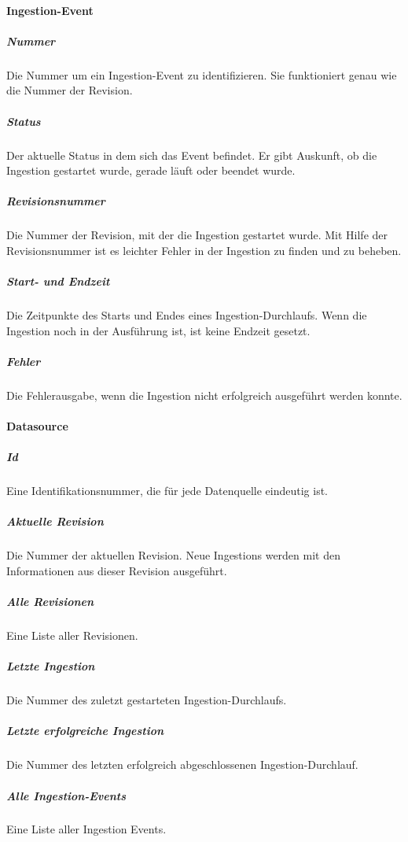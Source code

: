 \paragraph{Ingestion-Event}
\subparagraph{Nummer}
Die Nummer um ein Ingestion-Event zu identifizieren.
Sie funktioniert genau wie die Nummer der Revision.
\subparagraph{Status}
Der aktuelle Status in dem sich das Event befindet.
Er gibt Auskunft, ob die Ingestion gestartet wurde, gerade läuft oder beendet wurde.
\subparagraph{Revisionsnummer}
Die Nummer der Revision, mit der die Ingestion gestartet wurde.
Mit Hilfe der Revisionsnummer ist es leichter Fehler in der Ingestion zu finden und zu beheben.
\subparagraph{Start- und Endzeit}
Die Zeitpunkte des Starts und Endes eines Ingestion-Durchlaufs.
Wenn die Ingestion noch in der Ausführung ist, ist keine Endzeit gesetzt.
\subparagraph{Fehler}
Die Fehlerausgabe, wenn die Ingestion nicht erfolgreich ausgeführt werden konnte.

\paragraph{Datasource}
\subparagraph{Id}
Eine Identifikationsnummer, die für jede Datenquelle eindeutig ist.
\subparagraph{Aktuelle Revision}
Die Nummer der aktuellen Revision.
Neue Ingestions werden mit den Informationen aus dieser Revision ausgeführt.
\subparagraph{Alle Revisionen}
Eine Liste aller Revisionen.
\subparagraph{Letzte Ingestion}
Die Nummer des zuletzt gestarteten Ingestion-Durchlaufs.
\subparagraph{Letzte erfolgreiche Ingestion}
Die Nummer des letzten erfolgreich abgeschlossenen Ingestion-Durchlauf.
\subparagraph{Alle Ingestion-Events}
Eine Liste aller Ingestion Events.